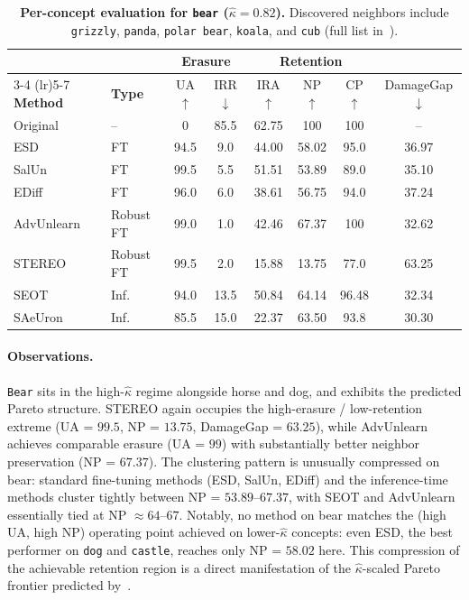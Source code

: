 \begin{table}[ht]
\centering
\small
\setlength{\tabcolsep}{5pt}
\begin{tabular}{llcccccc}
\toprule
& & \multicolumn{2}{c}{\textbf{Erasure}} & \multicolumn{3}{c}{\textbf{Retention}} & \\
\cmidrule(lr){3-4} \cmidrule(lr){5-7}
\textbf{Method} & \textbf{Type} & UA$\uparrow$ & IRR$\downarrow$ & IRA$\uparrow$ & NP$\uparrow$ & CP$\uparrow$ & DamageGap$\downarrow$ \\
\midrule
Original    & --          & 0     & 85.5  & 62.75 & 100   & 100   & --    \\
\midrule
ESD         & FT          & 94.5  & 9.0   & 44.00 & 58.02 & 95.0  & 36.97 \\
SalUn       & FT          & 99.5  & 5.5   & 51.51 & 53.89 & 89.0  & 35.10 \\
EDiff       & FT          & 96.0  & 6.0   & 38.61 & 56.75 & 94.0  & 37.24 \\
\midrule
AdvUnlearn  & Robust FT   & 99.0  & 1.0   & 42.46 & 67.37 & 100   & 32.62 \\
STEREO      & Robust FT   & 99.5  & 2.0   & 15.88 & 13.75 & 77.0  & 63.25 \\
\midrule
SEOT        & Inf.        & 94.0  & 13.5  & 50.84 & 64.14 & 96.48 & 32.34 \\
SAeUron     & Inf.        & 85.5  & 15.0  & 22.37 & 63.50 & 93.8  & 30.30 \\
\bottomrule
\end{tabular}
\caption{\textbf{Per-concept evaluation for \texttt{bear} ($\hat\kappa = 0.82$).} Discovered neighbors include \texttt{grizzly}, \texttt{panda}, \texttt{polar bear}, \texttt{koala}, and \texttt{cub} (full list in~).}
\label{tab:per_concept_bear}
\end{table}

\paragraph{Observations.}
\texttt{Bear} sits in the high-$\hat\kappa$ regime alongside horse and dog, and exhibits the predicted Pareto structure. STEREO again occupies the high-erasure / low-retention extreme (UA = $99.5$, NP = $13.75$, DamageGap = $63.25$), while AdvUnlearn achieves comparable erasure (UA = $99$) with substantially better neighbor preservation (NP = $67.37$). The clustering pattern is unusually compressed on bear: standard fine-tuning methods (ESD, SalUn, EDiff) and the inference-time methods cluster tightly between NP = $53.89$--$67.37$, with SEOT and AdvUnlearn essentially tied at NP $\approx 64$--$67$. Notably, no method on bear matches the (high UA, high NP) operating point achieved on lower-$\hat\kappa$ concepts: even ESD, the best performer on \texttt{dog} and \texttt{castle}, reaches only NP = $58.02$ here. This compression of the achievable retention region is a direct manifestation of the $\hat\kappa$-scaled Pareto frontier predicted by~.
